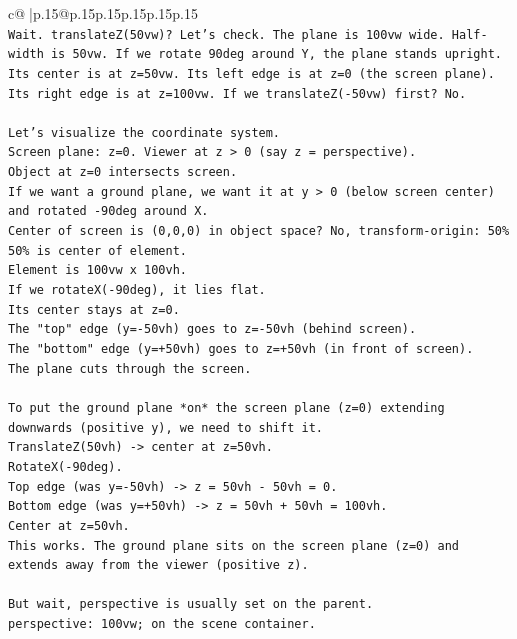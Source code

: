 \documentclass{article}
\begin{document}
{\begin{supertabular}{c@{$\;$}|p{.15\linewidth}@{}p{.15\linewidth}p{.15\linewidth}p{.15\linewidth}p{.15\linewidth}p{.15\linewidth}}
{{{\\ 
\texttt{Wait. translateZ(50vw)? Let's check. The plane is 100vw wide. Half{-}width is 50vw. If we rotate 90deg around Y, the plane stands upright. Its center is at z=50vw. Its left edge is at z=0 (the screen plane). Its right edge is at z=100vw. If we translateZ({-}50vw) first? No.} \\
\\ 
\texttt{Let's visualize the coordinate system.} \\
\texttt{Screen plane: z=0. Viewer at z > 0 (say z = perspective).} \\
\texttt{Object at z=0 intersects screen.} \\
\texttt{If we want a ground plane, we want it at y > 0 (below screen center) and rotated {-}90deg around X.} \\
\texttt{Center of screen is (0,0,0) in object space? No, transform{-}origin: 50\% 50\% is center of element.} \\
\texttt{Element is 100vw x 100vh.} \\
\texttt{If we rotateX({-}90deg), it lies flat.} \\
\texttt{Its center stays at z=0.} \\
\texttt{The "top" edge (y={-}50vh) goes to z={-}50vh (behind screen).} \\
\texttt{The "bottom" edge (y=+50vh) goes to z=+50vh (in front of screen).} \\
\texttt{The plane cuts through the screen.} \\
\\ 
\texttt{To put the ground plane *on* the screen plane (z=0) extending downwards (positive y), we need to shift it.} \\
\texttt{TranslateZ(50vh) {-}> center at z=50vh.} \\
\texttt{RotateX({-}90deg).} \\
\texttt{Top edge (was y={-}50vh) {-}> z = 50vh {-} 50vh = 0.} \\
\texttt{Bottom edge (was y=+50vh) {-}> z = 50vh + 50vh = 100vh.} \\
\texttt{Center at z=50vh.} \\
\texttt{This works. The ground plane sits on the screen plane (z=0) and extends away from the viewer (positive z).} \\
\\ 
\texttt{But wait, perspective is usually set on the parent.} \\
\texttt{perspective: 100vw; on the scene container.} \\
}}}
\end{supertabular}}
\end{document}
